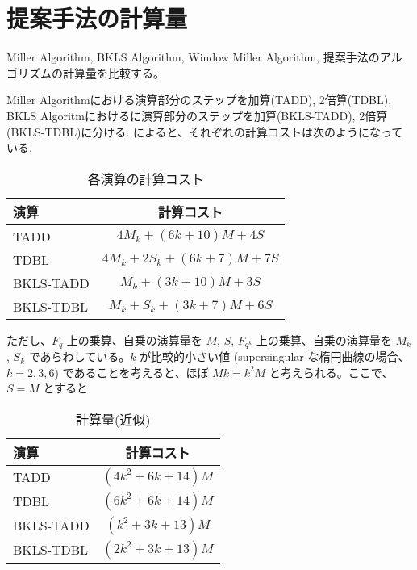 \section{提案手法の計算量}
Miller Algorithm, BKLS Algorithm, Window Miller Algorithm, 提案手法のアルゴリズムの計算量を比較する。
\par
Miller Algorithmにおける演算部分のステップを加算(TADD), 2倍算(TDBL), BKLS Algoritmにおけるに演算部分のステップを加算(BKLS-TADD), 2倍算(BKLS-TDBL)に分ける. \cite{TATE}によると、それぞれの計算コストは次のようになっている.
\begin{table}[htbp]
 \begin{center}
  \begin{tabular}{|l|c|}
  \hline
  演算 & 計算コスト \\
  \hline
  TADD & $4M_k + (6k+10)M + 4S$ \\
  \hline
  TDBL & $4M_k + 2S_k + (6k+7)M + 7S$ \\
  \hline
  BKLS-TADD & $M_k + (3k+10)M + 3S$ \\
  \hline
  BKLS-TDBL & $M_k + S_k + (3k+7)M + 6S$ \\
  \hline
  \end{tabular}
 \end{center}
 \caption{各演算の計算コスト}
\end{table}
\par
ただし、$F_q$ 上の乗算、自乗の演算量を $M$, $S$, $F_{q^k}$ 上の乗算、自乗の演算量を $M_k$, $S_k$ であらわしている。$k$ が比較的小さい値 (supersingular な楕円曲線の場合、$k = 2, 3, 6$) であることを考えると、ほぼ $Mk = k^2M$ と考えられる。ここで、 $S = M$ とすると \\

\begin{table}[htbp]
\begin{center}
\begin{tabular}{|l|c|}
\hline
 演算 & 計算コスト\\
 \hline
 TADD & $(4k^2 + 6k + 14)M$ \\
 \hline
 TDBL & $(6k^2 + 6k + 14)M$ \\
 \hline
  BKLS-TADD & $(k^2 + 3k + 13)M$ \\
  \hline
  BKLS-TDBL & $(2k^2 + 3k + 13)M$ \\
  \hline
\end{tabular}
\end{center}
\caption{計算量(近似)}
\end{table}

